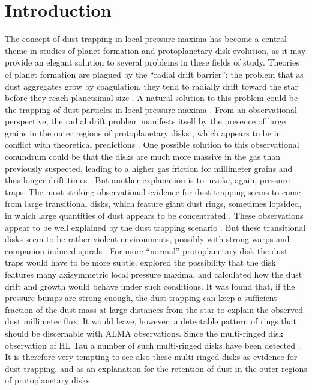 \documentclass{aa}
\begin{document}
\section{Introduction}
The concept of dust trapping in local pressure maxima has become a central theme
in studies of planet formation and protoplanetary disk evolution, as it may
provide an elegant solution to several problems in these fields of
study. Theories of planet formation are plagued by the ``radial drift barrier'':
the problem that as dust aggregates grow by coagulation, they tend to radially
drift toward the star before they reach planetsimal size
\citep[e.g.][]{2010A&A...513A..79B}. A natural solution to this problem could be
the trapping of dust particles in local pressure maxima
\citep{1972fpp..conf..211W, 2007ApJ...664L..55K, 1995A&A...295L...1B,
  1997Icar..128..213K}. From an observational perspective, the radial drift
problem manifests itself by the presence of large grains in the outer regions of
protoplanetary disks \citep{2003A&A...403..323T, 2009ApJ...700.1502A}, which
appears to be in conflict with theoretical predictions
\citep{2007A&A...469.1169B}. One possible solution to this observational
conundrum could be that the disks are much more massive in the gas than
previously suspected, leading to a higher gas friction for millimeter grains and
thus longer drift times \citep{2017ApJ...840...93P}. But another explanation is
to invoke, again, pressure traps. The most striking observational evidence for
dust trapping seems to come from large transitional disks, which feature giant
dust rings, sometimes lopsided, in which large quantities of dust appears to be
concentrated \citep{2013Natur.493..191C, 2013Sci...340.1199V}. These observations
appear to be well explained by the dust trapping scenario
\citet{2012A&A...545A..81P}. But these transitional disks seem to be rather
violent environments, possibly with strong warps \citep{2015ApJ...798L..44M,
  2017A&A...597A..42B} and companion-induced spirals
\citep{2016ApJ...816L..12D}. For more ``normal'' protoplanetary disk the dust
traps would have to be more subtle. \cite{2012A&A...538A.114P} explored the
possibility that the disk features many axisymmetric local pressure maxima, and
calculated how the dust drift and growth would behave under such conditions. It
was found that, if the pressure bumps are strong enough, the dust trapping can
keep a sufficient fraction of the dust mass at large distances from the star to
explain the observed dust millimeter flux. It would leave, however, a detectable
pattern of rings that should be discernable with ALMA observations.  Since the
multi-ringed disk observation of HL Tau \citep{2015ApJ...808L...3A} a number of
such multi-ringed disks have been detected \citep{2016ApJ...820L..40A,
  2016PhRvL.117y1101I, 2017ApJ...851L..23C, 2017A&A...600A..72F,
  2018A&A...610A..24F}. It is therefore very tempting to see also these
multi-ringed disks as evidence for dust trapping, and as an explanation for
the retention of dust in the outer regions of protoplanetary disks.
\end{document}
